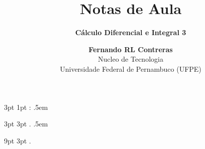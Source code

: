  {3pt}%
  {1pt}%
  {}%
  {}%
  {\itshape}%
  {:}%
  {.5em}%
  {}%

\theoremstyle{note}
\newtheorem{note}{Note}

  {3pt}%
  {3pt}%
  {\itshape}%
  {}%
  {\bfseries}%
  {.}%
  {.5em}%
  {}%

\theoremstyle{citing}
\newtheorem*{varthm}{}%

  {9pt}%
  {3pt}%
  {\itshape}%
  {}%
  {\bfseries}%
  {.}%
  {\newline}%
  {}%

\theoremstyle{break}
\newtheorem{bthm}{B-Theorem}

\theoremstyle{exercise}
\newtheorem{exer}{Exercise}

\swapnumbers
\theoremstyle{plain}
\newtheorem{thmsw}{Theorem}[section]
\newtheorem{propsw}{Proposition}

\let\lvert=|\let\rvert=|
\newcommand{\Ric}{\mathop{\mathrm{Ric}}\nolimits}

\addtolength{\textwidth}{8pt}

\title{ \textbf{Notas de Aula}}
\subtitle{\textbf{Cálculo Diferencial e Integral 3}}
\author{\textbf{Fernando RL Contreras}\\
	\large Nucleo de Tecnologia\\
	Universidade Federal de Pernambuco (UFPE)}


